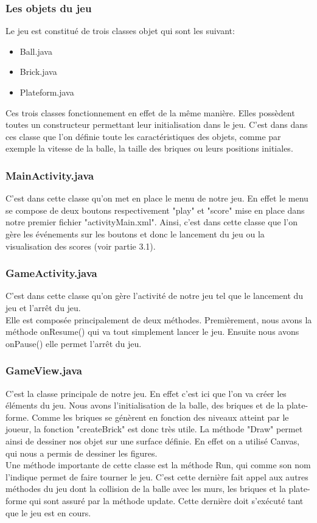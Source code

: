 \documentclass[a4paper]{article}
\begin{document}
\subsubsection{Les objets du jeu }
Le jeu est constitué de trois classes  objet qui sont les suivant:
\begin{itemize}
 \item Ball.java
 \item Brick.java
 \item Plateform.java
\end{itemize}
Ces trois classes fonctionnement en effet de la même manière. Elles possèdent toutes un constructeur permettant leur initialisation dans le jeu. C'est dans dans ces classe que l'on définie toute les caractéristiques des objets, comme par exemple la vitesse de la balle, la taille des briques ou leurs positions initiales.

\subsubsection{MainActivity.java}
C'est dans cette classe qu'on met en place le menu de notre jeu. En effet le menu se compose de deux boutons respectivement "play" et "score" mise en place dans notre premier fichier "activityMain.xml". Ainsi, c'est dans cette classe que l'on gère les événements sur les boutons et donc le lancement du jeu ou la visualisation des scores (voir partie 3.1).

\subsubsection{GameActivity.java}
C'est dans cette classe qu'on gère l'activité de notre jeu tel que le lancement du jeu et l’arrêt du jeu.\\
Elle est composée principalement de deux méthodes. Premièrement, nous avons la méthode onResume() qui va tout simplement lancer le jeu. Ensuite nous avons onPause() elle permet l’arrêt du jeu. 

\subsubsection{GameView.java}
C'est la classe principale de notre jeu. En effet c'est ici que l'on va créer les éléments du jeu. Nous avons l'initialisation de la balle, des briques et de la plate-forme. Comme les briques se génèrent en fonction des niveaux atteint par le joueur, la fonction "createBrick" est donc très utile. La méthode "Draw" permet ainsi de dessiner nos objet sur une surface définie. En effet on a utilisé Canvas, qui nous a permis de dessiner les figures.\\
Une méthode importante de cette classe est la méthode Run, qui comme son nom l'indique permet de faire tourner le jeu. C'est cette dernière fait appel aux autres méthodes du jeu dont la collision de la balle avec les murs, les briques  et la plate-forme qui sont assuré par la méthode update. Cette dernière doit s’exécuté tant que le jeu est en cours. 
\end{document}
